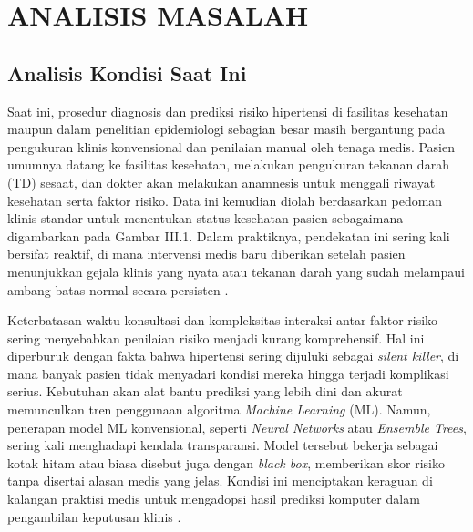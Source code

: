 
\chapter{ANALISIS MASALAH}
\label{chap:analisis-masalah}

\section{Analisis Kondisi Saat Ini}
Saat ini, prosedur diagnosis dan prediksi risiko hipertensi di fasilitas kesehatan maupun dalam penelitian epidemiologi sebagian besar masih bergantung pada pengukuran klinis konvensional dan penilaian manual oleh tenaga medis. Pasien umumnya datang ke fasilitas kesehatan, melakukan pengukuran tekanan darah (TD) sesaat, dan dokter akan melakukan anamnesis untuk menggali riwayat kesehatan serta faktor risiko. Data ini kemudian diolah berdasarkan pedoman klinis standar untuk menentukan status kesehatan pasien sebagaimana digambarkan pada Gambar III.1. Dalam praktiknya, pendekatan ini sering kali bersifat reaktif, di mana intervensi medis baru diberikan setelah pasien menunjukkan gejala klinis yang nyata atau tekanan darah yang sudah melampaui ambang batas normal secara persisten \parencite{Mills2020Global}.

Keterbatasan waktu konsultasi dan kompleksitas interaksi antar faktor risiko sering menyebabkan penilaian risiko menjadi kurang komprehensif. Hal ini diperburuk dengan fakta bahwa hipertensi sering dijuluki sebagai \textit{silent killer}, di mana banyak pasien tidak menyadari kondisi mereka hingga terjadi komplikasi serius. Kebutuhan akan alat bantu prediksi yang lebih dini dan akurat memunculkan tren penggunaan algoritma \textit{Machine Learning} (ML). Namun, penerapan model ML konvensional, seperti \textit{Neural Networks} atau \textit{Ensemble Trees}, sering kali menghadapi kendala transparansi. Model tersebut bekerja sebagai kotak hitam atau biasa disebut juga dengan \textit{black box}, memberikan skor risiko tanpa disertai alasan medis yang jelas. Kondisi ini menciptakan keraguan di kalangan praktisi medis untuk mengadopsi hasil prediksi komputer dalam pengambilan keputusan klinis \parencite{Amann2020Explainability}.

